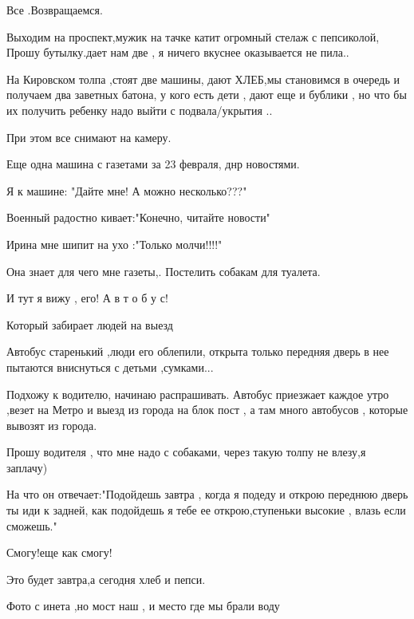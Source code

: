 Все .Возвращаемся.

Выходим на проспект,мужик на тачке катит огромный стелаж с пепсиколой, Прошу
бутылку.дает нам две , я ничего вкуснее оказывается не пила..

На Кировском  толпа ,стоят две машины, дают ХЛЕБ,мы становимся в очередь и
получаем два заветных батона, у кого есть дети , дают еще и бублики , но что бы
их получить ребенку надо выйти с подвала/укрытия ..

При этом все снимают на камеру.

Еще одна машина с газетами за 23 февраля, днр новостями.  

Я к машине: "Дайте мне! А можно несколько???"

Военный радостно кивает:"Конечно, читайте новости"

Ирина мне шипит на ухо :"Только  молчи!!!!"

Она знает для чего мне газеты,.  Постелить собакам для туалета.

И тут я вижу , его! А в т о б у с! 

Который забирает людей на выезд

Автобус старенький ,люди его облепили, открыта только передняя дверь в нее
пытаются вниснуться с детьми ,сумками...

Подхожу к водителю, начинаю распрашивать. Автобус приезжает каждое утро ,везет
на Метро и выезд из города на блок пост , а там  много автобусов , которые
вывозят из города.

Прошу водителя , что мне надо с собаками, через такую толпу не влезу,я заплачу)

На что он отвечает:"Подойдешь завтра , когда я подеду и открою переднюю дверь
ты иди к задней,  как подойдешь я тебе ее открою,ступеньки высокие , влазь если
сможешь."

Смогу!еще как смогу!

Это будет завтра,а сегодня хлеб и пепси.

Фото с инета ,но мост наш , и место где мы брали воду
